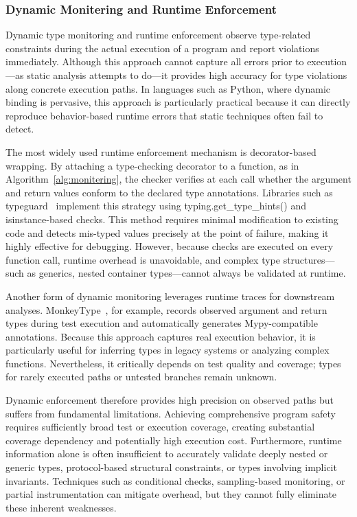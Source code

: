 \subsubsection{\textbf{Dynamic Monitering and Runtime Enforcement}}
Dynamic type monitoring and runtime enforcement observe type-related
constraints during the actual execution of a program and report violations
immediately.
Although this approach cannot capture all errors prior to execution—as static
analysis attempts to do—it provides high accuracy for type violations along
concrete execution paths.
In languages such as Python, where dynamic binding is pervasive, this approach
is particularly practical because it can directly reproduce behavior-based
runtime errors that static techniques often fail to detect.

The most widely used runtime enforcement mechanism is decorator-based wrapping.
By attaching a type-checking decorator to a function, as in
Algorithm~\autoref{alg:monitering}, the checker verifies at each call whether
the argument and return values conform to the declared type annotations.
Libraries such as typeguard~\cite{typeguard} implement this strategy using
typing.get\_type\_hints() and isinstance-based checks.
This method requires minimal modification to existing code and detects
mis-typed values precisely at the point of failure, making it highly effective
for debugging.
However, because checks are executed on every function call, runtime overhead
is unavoidable, and complex type structures—such as generics, nested container
types—cannot always be validated at runtime.

Another form of dynamic monitoring leverages runtime traces for downstream
analyses.
MonkeyType~\cite{monkeytype}, for example, records observed argument and return
types during test execution and automatically generates Mypy-compatible
annotations.
Because this approach captures real execution behavior, it is particularly
useful for inferring types in legacy systems or analyzing complex functions.
Nevertheless, it critically depends on test quality and coverage; types for
rarely executed paths or untested branches remain unknown.

Dynamic enforcement therefore provides high precision on observed paths but
suffers from fundamental limitations.
Achieving comprehensive program safety requires sufficiently broad test or
execution coverage, creating substantial coverage dependency and potentially
high execution cost.
Furthermore, runtime information alone is often insufficient to accurately
validate deeply nested or generic types, protocol-based structural constraints,
or types involving implicit invariants.
Techniques such as conditional checks, sampling-based monitoring, or partial
instrumentation can mitigate overhead, but they cannot fully eliminate these
inherent weaknesses.

